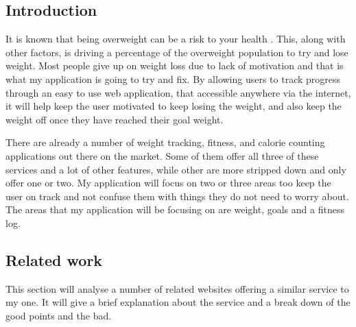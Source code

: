 \subsection{Introduction}
It is known that being overweight can be a risk to your health \citep{theordre:1985}. This, along with other factors, is driving a percentage of the overweight population to try and lose weight. Most people give up on weight loss due to lack of motivation and that is what my application is going to try and fix. By allowing users to track progress through an easy to use web application, that accessible anywhere via the internet, it will help keep the user motivated to keep losing the weight, and also keep the weight off once they have reached their goal weight.

There are already a number of weight tracking, fitness, and calorie counting applications out there on the market. Some of them offer all three of these services and a lot of other features, while other are more stripped down and only offer one or two. My application will focus on two or three areas too keep the user on track and not confuse them with things they do not need to worry about. The areas that my application will be focusing on are weight, goals and a fitness log.

\subsection{Related work}
This section will analyse a number of related websites offering a similar service to my one. It will give a brief explanation about the service and a break down of the good points and the bad.

